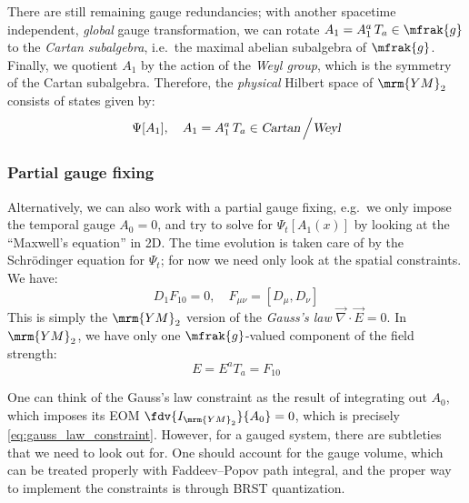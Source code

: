 \documentclass[a4paper
	,10pt
]{article}
\newcommand{\YM}{{\ensuremath{\mrm{YM}_2}}\xspace}
\begin{document}
	There are still remaining gauge redundancies; with another spacetime independent, \textit{global} gauge transformation, we can rotate $
		A_1 = A_1^a\,T_a \in \mfrak{g}
	$ to the \textit{Cartan subalgebra}, i.e.~the maximal abelian subalgebra of $\mfrak{g}$. Finally, we quotient $A_1$ by the action of the \textit{Weyl group}, which is the symmetry of the Cartan subalgebra. Therefore, the \textit{physical} Hilbert space of \YM consists of states given by:
	\begin{equation}
		\Psi[A_1],\quad
		A_1
		= A_1^a\,T_a
		\in \textsl{Cartan} \,\Big/ \textsl{Weyl}
	\label{eq:hilbert_space}
	\end{equation}
\subsubsection{Partial gauge fixing}
	Alternatively, we can also work with a partial gauge fixing, e.g.~we only impose the temporal gauge $A_0 = 0$, and try to solve for $\Psi_t[A_1(x)]$ by looking at the ``Maxwell's equation'' in 2D. The time evolution is taken care of by the Schr\"odinger equation for $\Psi_t$; for now we need only look at the spatial constraints. We have:
	\begin{equation}
		D_1 F_{10} = 0,
	\quad
		F_{\mu\nu} = [D_\mu,D_\nu]
	\label{eq:gauss_law_constraint}
	\end{equation}
	This is simply the \YM version of the \textit{Gauss's law} $\vec{\nabla}\cdot\vec{E} = 0$. In \YM, we have only one $\mfrak{g}$-valued component of the field strength:
	\begin{equation}
		E = E^a T_a = F_{10}
	\end{equation} 
	
	One can think of the Gauss's law constraint as the result of integrating out $A_0$, which imposes its EOM $\fdv{I_\YM}{A_0} = 0$, which is precisely \eqref{eq:gauss_law_constraint}. 
	However, for a gauged system, there are subtleties that we need to look out for. One should account for the gauge volume, which can be treated properly with Faddeev--Popov path integral, and the proper way to implement the constraints is through BRST quantization. 
	
\end{document}
